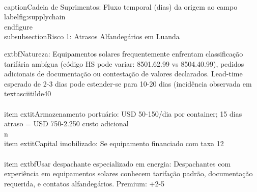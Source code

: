 \documentclass[12pt, a4paper]{article}
\begin{document}
{{{{{{{{{\\caption{Cadeia de Suprimentos: Fluxo temporal (dias) da origem ao campo}
\\label{fig:supplychain}
\\end{figure}\n\n\\subsubsection{Risco 1: Atrasos Alfandegários em Luanda}

	extbf{Natureza:} Equipamentos solares frequentemente enfrentam classificação tarifária ambígua (código HS pode variar: 8501.62.99 vs 8504.40.99), pedidos adicionais de documentação ou contestação de valores declarados. Lead-time esperado de 2-3 dias pode estender-se para 10-20 dias (incidência observada em \\textasciitilde40\\%
\\item 	extit{Armazenamento portuário}: USD 50-150/dia por container; 15 dias atraso = USD 750-2.250 custo adicional\\n\n\\item 	extit{Capital imobilizado}: Se equipamento financiado com taxa 12\\%
\\item 	extbf{Usar despachante especializado em energia:} Despachantes com experiência em equipamentos solares conhecem tarifação padrão, documentação requerida, e contatos alfandegários. Premium: +2-5\\%
}}}}}}}}}
\end{document}
